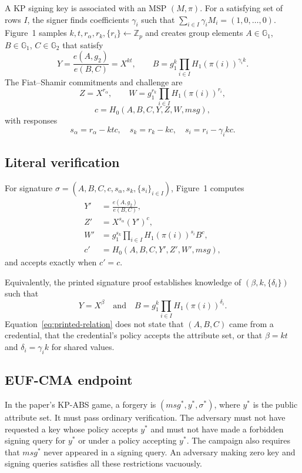 \documentclass[10pt,a4paper]{article}
\newcommand{\Zp}{\mathbb{Z}_p}
\newcommand{\gone}{\mathbb{G}_1}
\newcommand{\gtwo}{\mathbb{G}_2}
\begin{document}
A KP signing key is associated with an MSP $(M,\pi)$. For a satisfying set of
rows $I$, the signer finds coefficients $\gamma_i$ such that
$\sum_{i\in I}\gamma_i M_i=(1,0,\ldots,0)$. Figure~1 samples
$k,t,r_\alpha,r_k,\{r_i\}\leftarrow\Zp$ and creates group elements
$A\in\gone$, $B\in\gone$, $C\in\gtwo$ that satisfy
\[
 Y=\frac{e(A,g_2)}{e(B,C)}=X^{kt},
 \qquad
 B=g_1^k\prod_{i\in I}H_1(\pi(i))^{\gamma_i k}.
\]
The Fiat--Shamir commitments and challenge are
\[
 Z=X^{r_\alpha},\qquad
 W=g_1^{r_k}\prod_{i\in I}H_1(\pi(i))^{r_i},
\]
\[
 c=H_0(A,B,C,Y,Z,W,\mathit{msg}),
\]
with responses
\[
 s_\alpha=r_\alpha-ktc,\quad
 s_k=r_k-kc,\quad
 s_i=r_i-\gamma_i kc.
\]

\subsection{Literal verification}

For signature
$\sigma=(A,B,C,c,s_\alpha,s_k,\{s_i\}_{i\in I})$, Figure~1 computes
\begin{align*}
Y'&=\frac{e(A,g_2)}{e(B,C)},\\
Z'&=X^{s_\alpha}(Y')^c,\\
W'&=g_1^{s_k}\prod_{i\in I}H_1(\pi(i))^{s_i}B^c,\\
c'&=H_0(A,B,C,Y',Z',W',\mathit{msg}),
\end{align*}
and accepts exactly when $c'=c$.

Equivalently, the printed signature proof establishes knowledge of
$(\beta,k,\{\delta_i\})$ such that
\begin{equation}\label{eq:printed-relation}
Y=X^\beta
\quad\text{and}\quad
B=g_1^k\prod_{i\in I}H_1(\pi(i))^{\delta_i}.
\end{equation}
Equation~\eqref{eq:printed-relation} does not state that $(A,B,C)$ came from a
credential, that the credential's policy accepts the attribute set, or that
$\beta=kt$ and $\delta_i=\gamma_i k$ for shared values.

\subsection{EUF-CMA endpoint}

In the paper's KP-ABS game, a forgery is
$(\mathit{msg}^*,y^*,\sigma^*)$, where $y^*$ is the public attribute set. It
must pass ordinary verification. The adversary must not have requested a key
whose policy accepts $y^*$ and must not have made a forbidden signing query
for $y^*$ or under a policy accepting $y^*$. The campaign also requires that
$\mathit{msg}^*$ never appeared in a signing query. An adversary making zero
key and signing queries satisfies all these restrictions vacuously.
\end{document}
